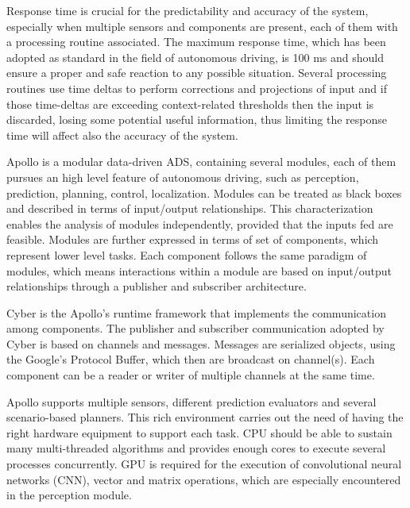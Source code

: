 \documentclass[conference]{IEEEtran}
\begin{document}
Response time \cite{b1} is crucial for the predictability and accuracy of the system, especially when multiple sensors and components are present, each of them with a processing routine associated.
The maximum response time, which has been adopted as standard in the field of autonomous driving, is 100 ms and should ensure a proper and safe reaction to any possible situation.
Several processing routines use time deltas to perform corrections and projections of input and if those time-deltas are exceeding context-related thresholds then the input is discarded, losing some potential useful information, thus limiting the response time will affect also the accuracy of the system. 

Apollo is a modular data-driven ADS, containing several modules, each of them pursues an high level feature of autonomous driving, such as perception, prediction, planning, control, localization.
Modules can be treated as black boxes and described in terms of input/output relationships.
This characterization enables the analysis of modules independently, provided that the inputs fed are feasible.
Modules are further expressed in terms of set of components, which represent lower level tasks.
Each component follows the same paradigm of modules, which means interactions within a module are based on input/output relationships through a publisher and subscriber architecture.

Cyber is the Apollo's runtime framework that implements the communication among components.
The publisher and subscriber communication adopted by Cyber is based on channels and messages.
Messages are serialized objects, using the Google's Protocol Buffer, which then are broadcast on channel(s).
Each component can be a reader or writer of multiple channels at the same time.

Apollo supports multiple sensors, different prediction evaluators and several scenario-based planners.
This rich environment carries out the need of having the right hardware equipment to support each task.
CPU should be able to sustain many multi-threaded algorithms and provides enough cores to execute several processes concurrently.
GPU is required for the execution of convolutional neural networks (CNN), vector and matrix operations, which are especially encountered in the perception module.
\end{document}
